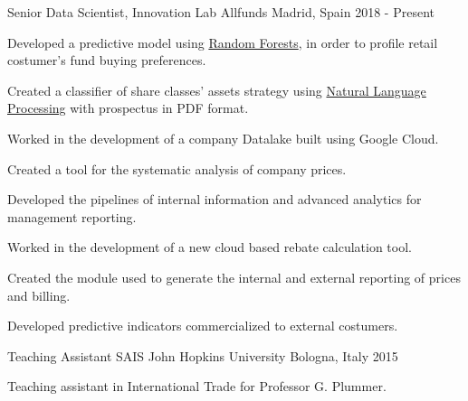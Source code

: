 

\begin{cventries}

\cventry
    {Senior Data Scientist, Innovation Lab} %
    {Allfunds} %
    {Madrid, Spain} %
    {2018 - Present} %
    {
        \begin{cvitems} %
            \item {Developed a predictive model using \href{https://en.wikipedia.org/wiki/Random_forest}{Random Forests}, in order to profile retail costumer's fund buying preferences.}
            \item {Created a classifier of share classes' assets strategy using \href{https://en.wikipedia.org/wiki/Natural_language_processing}{Natural Language Processing} with prospectus in PDF format.}
            \item {Worked in the development of a company Datalake built using Google Cloud.}
            \item {Created a tool for the systematic analysis of company prices.}
            \item {Developed the pipelines of internal information and advanced analytics for management reporting.}
            \item {Worked in the development of a new cloud based rebate calculation tool.}
            \item {Created the module used to generate the internal and external reporting of prices and billing.}
            \item {Developed predictive indicators commercialized to external costumers.}
        \end{cvitems}
    }

\cventry
    {Teaching Assistant} %
    {SAIS John Hopkins University} %
    {Bologna, Italy} %
    {2015} %
    {
        \begin{cvitems} %
            \item {Teaching assistant in International Trade for Professor G. Plummer.}
        \end{cvitems}
    }


\end{cventries}
